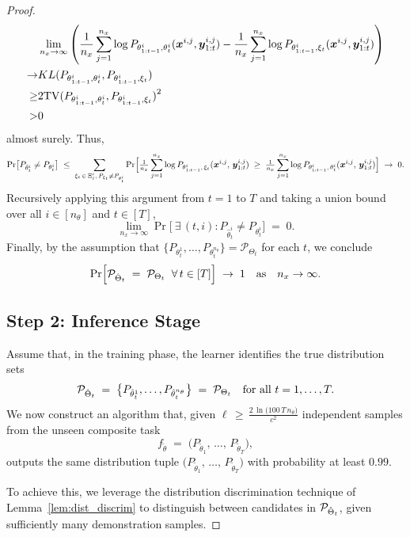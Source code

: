 \begin{proof}
\begin{align*}
&\lim _{n_x\to \infty }\left(\frac{1}{n_x} \sum_{j=1}^{n_x} \log P_{\theta_{1:t-1}^i,\theta^i_t}(\bm x^{i,j}, \bm y^{i,j}_{1:t})-\frac{1}{n_x} \sum_{j=1}^{n_x} \log P_{\theta_{1:t-1}^i,\xi_t}(\bm x^{i,j}, \bm y^{i,j}_{1:t})\right)\\
\to& KL(P_{\theta_{1:t-1}^i,\theta_t^i},P_{\theta_{1:t-1}^i,\xi_t})\\
\geq& 2{\mathrm{TV}}({P_{\theta_{1:t-1}^i,\theta_t^i},P_{\theta_{1:t-1}^i,\xi_t})}^2\\
>&0
\end{align*}
almost surely. Thus,
\[
\Pr\bigl[P_{\hat{\theta}_t^i} \neq P_{\theta_t^i}\bigr]
\;\le\;
\sum_{\xi_t \,\in\, \Xi_t',\, P_{\xi_t}\neq P_{\theta_t^i}}
  \Pr\Bigl[
    \tfrac1{n_x} \sum_{j=1}^{n_x} \log P_{\theta^i_{1:t-1},\,\xi_t}(\bm x^{i,j},\,\bm y^{i,j}_{1:t})
    \;\ge\;
    \tfrac1{n_x} \sum_{j=1}^{n_x} \log P_{\theta^i_{1:t-1},\,\theta_t^i}(\bm x^{i,j},\,\bm y^{i,j}_{1:t})
  \Bigr]
\;\to\; 0.
\]
Recursively applying this argument from $t=1$ to $T$ and taking a union bound over all $i\in[n_\theta]$ and $t\in[T]$,
\[
\lim_{n_x\to\infty} 
\Pr\bigl[~\exists\, (t,i) : P_{\hat{\theta}_t^i} \neq P_{\theta_t^i}\bigr]
\;=\;0.
\]
Finally, by the assumption that 
$\{P_{\theta^1_t}, \dots, P_{\theta^{n_\theta}_t}\} = \mathcal{P}_{\Theta_t}$ 
for each $t$, we conclude
\[
\Pr\Bigl[\mathcal{P}_{\hat{\Theta}_t} \;=\; \mathcal{P}_{\Theta_t} 
      \;\;\forall\,t \in[T]\Bigr]
\;\to\;1
\quad\text{as}\quad
n_x\to\infty.
\]




\subsection*{Step 2: Inference Stage}

Assume that, in the training phase, the learner identifies the true distribution sets 
\[
{\mathcal{P}}_{\hat{\Theta}_t} \;=\; \bigl\{P_{\hat{\theta}_t^1}, \dots, P_{\hat{\theta}_t^{n_\theta}}\bigr\}
\;=\; 
{\mathcal{P}}_{\Theta_t}
\quad
\text{for all }t=1,\dots,T.
\]
We now construct an algorithm that, given 
\(\ell \,\ge\, \tfrac{2\,\ln\bigl(100\,T\,n_{\theta}\bigr)}{c^2}\) 
independent samples from the unseen composite task 
\[
f_{\tilde{\theta}} 
\;=\;
\bigl(P_{\tilde{\theta}_1},\,\dots,\,P_{\tilde{\theta}_T}\bigr),
\]
outputs the same distribution tuple 
\(\bigl(P_{\tilde{\theta}_1},\,\dots,\,P_{\tilde{\theta}_T}\bigr)\) 
with probability at least \(0.99\). 

To achieve this, we leverage the distribution discrimination technique of Lemma~\ref{lem:dist_discrim} to distinguish between candidates in ${\mathcal{P}}_{\hat{\Theta}_t}$, given sufficiently many demonstration samples.


\end{proof}
